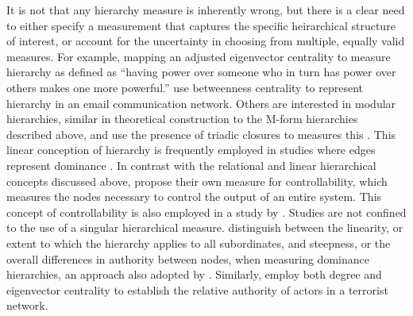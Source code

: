 \documentclass[3p,times]{elsarticle}
\begin{document}
It is not that any hierarchy measure is inherently wrong, but there is a clear need to either specify a measurement that captures the specific heirarchical structure of interest, or account for the uncertainty in choosing from multiple, equally valid measures. For example, \cite{bonachich_lloyd01} mapping an adjusted eigenvector centrality to measure hierarchy as defined as ``having power over someone who in turn has power over others makes one more powerful.'' \cite{valverde_sole_07} use betweenness centrality to represent hierarchy in an email communication network. Others are interested in modular hierarchies, similar in theoretical construction to the M-form hierarchies described above, and use the presence of triadic closures to measures this \cite{caldarelli_etal04}. This linear conception of hierarchy is frequently employed in studies where edges represent dominance \cite{pinterwollman_etal13}. In contrast with the relational and linear hierarchical concepts discussed above, \cite{liu_etal_11} propose their own measure for controllability, which measures the nodes necessary to control the output of an entire system. This concept of controllability is also employed in a study by \cite{cowan_etal12}. Studies are not confined to the use of a singular hierarchical measure. \cite{vries_etal06} distinguish between the linearity, or extent to which the hierarchy applies to all subordinates, and steepness, or the overall differences in authority between nodes, when measuring dominance hierarchies, an approach also adopted by \cite{cronin_sanchez12}. Similarly, \cite{shaikh_jiaxin06} employ both degree and eigenvector centrality to establish the relative authority of actors in a terrorist network.
\end{document}
